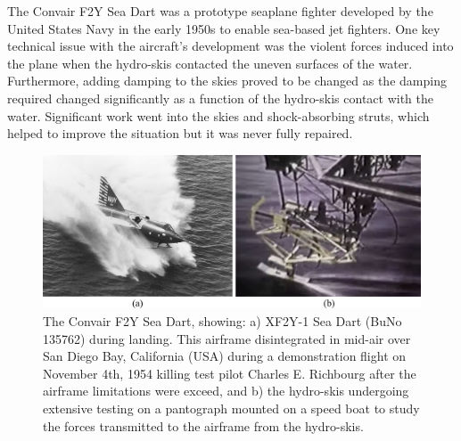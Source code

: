 \documentclass[12pt,letter]{article}
\begin{document}
		\begin{vibration_case_study}
			The Convair F2Y Sea Dart was a prototype seaplane fighter developed by the United States Navy in the early 1950s to enable sea-based jet fighters. One key technical issue with the aircraft's development was the violent forces induced into the plane when the hydro-skis contacted the uneven surfaces of the water. Furthermore, adding damping to the skies proved to be changed as the damping required changed significantly as a function of the hydro-skis contact with the water. Significant work went into the skies and shock-absorbing struts, which helped to improve the situation but it was never fully repaired.
			
			
			\begin{figure}[H]
				\centering
				\includegraphics[width=6.0in]{../figures/Convair_F2Y_SeaDart}
				\caption{The  Convair F2Y Sea Dart, showing: a) XF2Y-1 Sea Dart (BuNo 135762) during landing. This airframe disintegrated in mid-air over San Diego Bay, California (USA) during a demonstration flight on November 4th, 1954 killing test pilot Charles E. Richbourg after the airframe limitations were exceed\protect\footnotemark[1], and b) the hydro-skis undergoing extensive testing on a pantograph mounted on a speed boat to study the forces transmitted to the airframe from the hydro-skis\protect\footnotemark[2].}
			\end{figure}
		\end{vibration_case_study}
	
\end{document}
